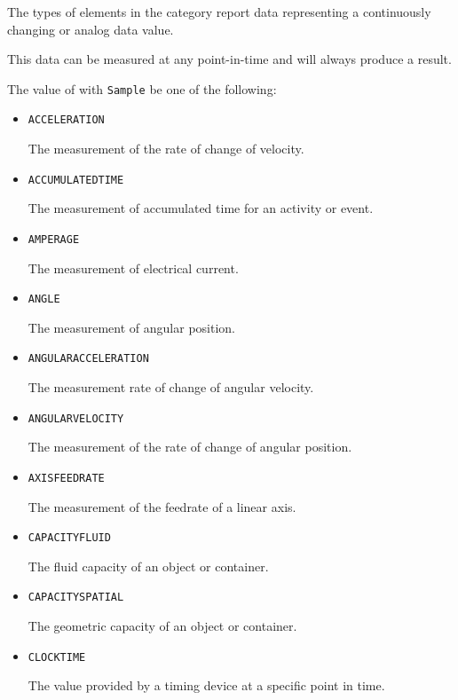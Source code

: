 The types of  elements in the  category report data representing a continuously changing or analog data value.

This data can be measured at any point-in-time and will always produce a result.


The value of  with  \texttt{Sample} \MUST be one of the following:
\begin{itemize}


\item \texttt{ACCELERATION}  

The measurement of the rate of change of velocity.


\item \texttt{ACCUMULATED\textunderscore TIME}  

The measurement of accumulated time for an activity or event.


\item \texttt{AMPERAGE}  

The measurement of electrical current.


\item \texttt{ANGLE}  

The measurement of angular position.


\item \texttt{ANGULAR\textunderscore ACCELERATION}  

The measurement rate of change of angular velocity.


\item \texttt{ANGULAR\textunderscore VELOCITY}  

The measurement of the rate of change of angular position.


\item \texttt{AXIS\textunderscore FEEDRATE}  

The measurement of the feedrate of a linear axis.


\item \texttt{CAPACITY\textunderscore FLUID}  

The fluid capacity of an object or container.


\item \texttt{CAPACITY\textunderscore SPATIAL}  

The geometric capacity of an object or container.


\item \texttt{CLOCK\textunderscore TIME}  

The value provided by a timing device at a specific point in time.



\end{itemize}
